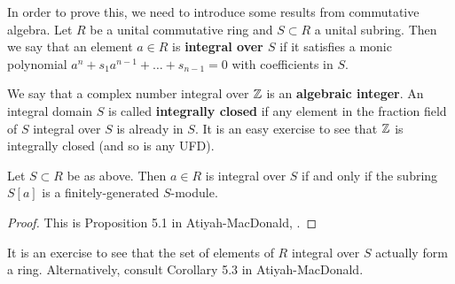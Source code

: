 \documentclass[11pt, english]{article}
\begin{document}
In order to prove this, we need to introduce some results from commutative algebra. Let $R$ be a unital commutative ring and $S \subset R$ a unital subring. Then we say that an element $a \in R$ is \textbf{integral over $S$} if it satisfies a monic polynomial $a^n+s_1a^{n-1}+\ldots+s_{n-1}=0$ with coefficients in $S$.

We say that a complex number integral over $\mathbb{Z}$ is an \textbf{algebraic integer}. An integral domain $S$ is called \textbf{integrally closed} if any element in the fraction field of $S$ integral over $S$ is already in $S$. It is an easy exercise to see that $\mathbb{Z}$ is integrally closed (and so is any UFD). 

\begin{lemma}
\label{lemmafingen}
 Let $S \subset R$ be as above. Then $a \in R$ is integral over $S$ if and only if the subring $S[a]$ is a finitely-generated $S$-module.
\end{lemma}
\begin{proof}
This is Proposition 5.1 in Atiyah-MacDonald, \cite{kommalg}.
\end{proof}

It is an exercise to see that the set of elements of $R$ integral over $S$ actually form a ring. Alternatively, consult Corollary 5.3 in Atiyah-MacDonald.
\end{document}
